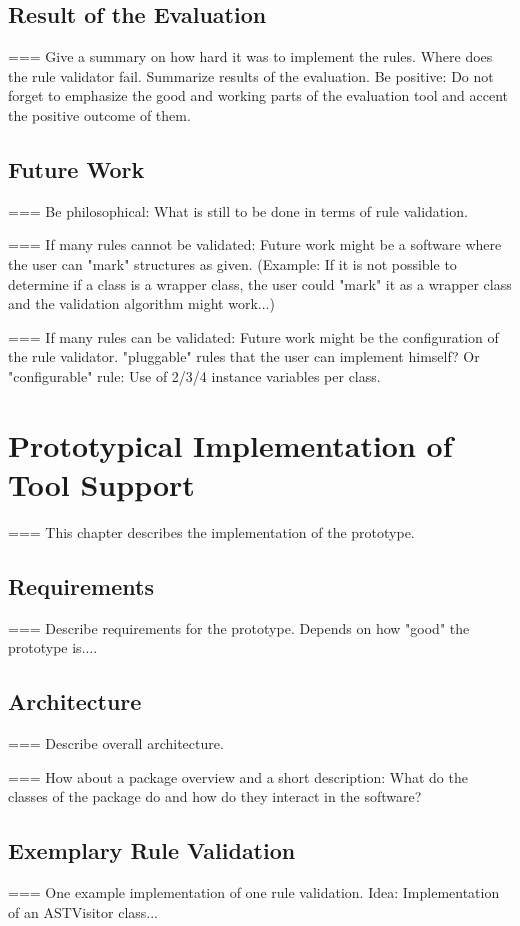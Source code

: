 \section{Result of the Evaluation}
\label{e:result}
=== Give a summary on how hard it was to implement the rules. Where does the rule validator fail. Summarize results of the evaluation. 
Be positive: Do not forget to emphasize the good and working parts of the evaluation tool and accent the positive outcome of them.
\section{Future Work}
\label{e:future}
=== Be philosophical: What is still to be done in terms of rule validation. 

=== If many rules cannot be validated: Future work might be a software where the user can "mark" structures as given. (Example: If it is not possible to determine if a class is a wrapper class, the user could "mark" it as a wrapper class and the validation algorithm might work...)

=== If many rules can be validated: Future work might be the configuration of the rule validator. "pluggable" rules that the user can implement himself? Or "configurable" rule: Use of 2/3/4 instance variables per class. 

\chapter{Prototypical Implementation of Tool Support}
\label{Prototype}
=== This chapter describes the implementation of the prototype. 
\section{Requirements}
=== Describe requirements for the prototype. Depends on how "good" the prototype is....
\section{Architecture}
=== Describe overall architecture. 

=== How about a package overview and a short description: What do the classes of the package do and how do they interact in the software? 
\section{Exemplary Rule Validation}
=== One example implementation of one rule validation. Idea: Implementation of an ASTVisitor class...


